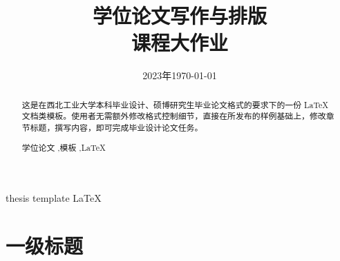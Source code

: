 \documentclass[lang=chs,degree=master,blindreview=true,winfonts=true]{yanputhesis}
\title{学位论文写作与排版\\课程大作业}{Academic writing and typesetting\\Assignment}
\author{\blindreview{张三丰}}{\blindreview{Zhang Sanfeng}}
\date{2023年}{2023}
\date{\today}
\title{}
\begin{document}
\frontmatter
\maketitle



\begin{abstract}            
    这是在西北工业大学本科毕业设计、硕博研究生毕业论文格式的要求下的一份 LaTeX
    文档类模板。使用者无需额外修改格式控制细节，直接在所发布的样例基础上，修改章
    节标题，撰写内容，即可完成毕业设计论文任务。            
    \begin{keywords}                                       
        学位论文 \sep 模板 \sep \LaTeX                      
    \end{keywords}                                         
\end{abstract}                                              

\begin{engabstract}                                         
    \noindent \blindtext                                    
    \begin{engkeywords}                                     
        thesis \ensep template \ensep \LaTeX                
    \end{engkeywords}                                       
\end{engabstract}                                           


\tableofcontents                                            
\listoffigures                                             
\listoftables                                               
\printnomenclature                                         

\mainmatter
\sDefault

\chapter{一级标题}
\label{sec:orga926640}
\end{document}

